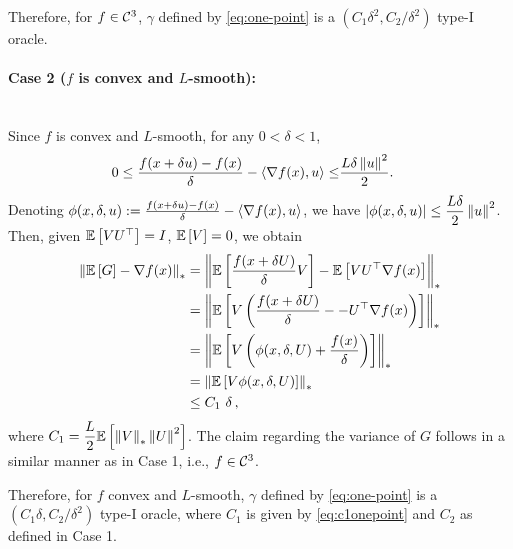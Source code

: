 Therefore, for $f \in \mathcal{C}^3$, $\gamma$ defined by \eqref{eq:one-point} is a $(C_1\delta^2, C_2/\delta^2)$ type-I oracle.

\paragraph{Case 2 ($f$ is convex and $L$-smooth):}\ \\
Since $f$ is convex and $L$-smooth, for any $0<\delta <1$,
\begin{align*}
 0 \le \frac{f(x + \delta u)-f(x)}{\delta}-\left\langle\nabla f(x), u\right\rangle \le&   \frac{L \delta \left\| u\right\|^2}{2}.
\end{align*}
Denoting
$\phi(x,\delta,u):=\frac{f(x + \delta u)-f(x)}{\delta}-\left\langle\nabla f(x), u\right\rangle$, we have
$\left|\phi(x,\delta,u) \right| \le  \dfrac{L\delta}{2} \left\|u\right\|^2$.
Then,  given $\mathbb{E}\left[VU^\top\right]=I$, $\mathbb{E}\left[V\right]=0$, we obtain
\begin{align}
\left\| \mathbb{E}\left[ G \right] - \nabla f(x) \right\|_*
&= \left\| \mathbb{E}\left[\frac{f(x + \delta U)}{\delta}V\right]-\mathbb{E}\left[VU^\top \nabla f(x)\right]  \right\|_*\nonumber\\
&=\left\| \mathbb{E}\left[V\left( \frac{f(x + \delta U)}{\delta}- -U^\top \nabla f(x)\right)\right]  \right\|_*\nonumber\\
&= \left\| \mathbb{E}\left[V\left( \phi(x,\delta,U)+\dfrac{f(x)}{\delta} \right)\right]  \right\|_*\nonumber\\
&=\left\| \mathbb{E}\left[V\phi(x,\delta,U)\right] \right\|_*\nonumber\\
&\le C_1 \,\, \delta\,, \label{eq:c1onepoint}
\end{align}
  where $C_1 = \dfrac{L}{2}\mathbb{E}\left[\left\|V\right\|_*\left\|U\right\|^2\right]$.
The claim regarding the variance of $G$ follows in a similar manner as in Case 1, i.e., $f \in \mathcal{C}^3$.

Therefore, for $f$ convex and $L$-smooth, $\gamma$ defined by \eqref{eq:one-point} is a $(C_1\delta, C_2/\delta^2)$ type-I oracle, where $C_1$ is given by \eqref{eq:c1onepoint} and $C_2$ as defined in Case 1.

